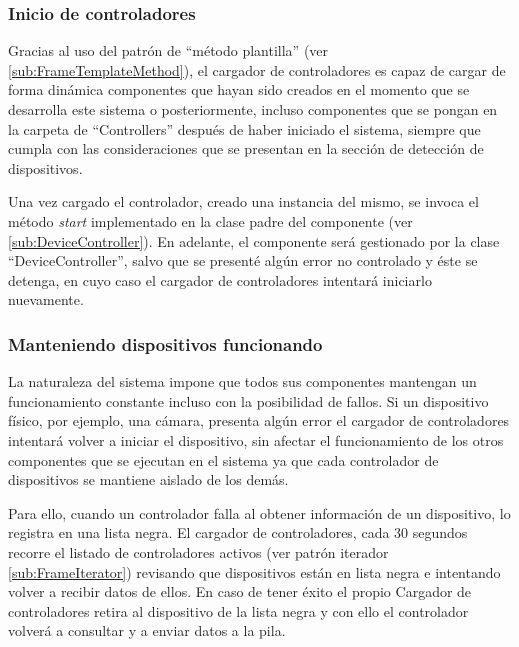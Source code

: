         \subsubsection{Inicio de controladores}
        \label{sub2:InputDeviceStarting}
            
            Gracias al uso del patrón de ``método plantilla'' (ver \ref{sub:FrameTemplateMethod}), el cargador de controladores es capaz de cargar de forma dinámica componentes que hayan sido creados en el momento que se desarrolla este sistema o posteriormente, incluso componentes que se pongan en la carpeta de ``Controllers'' después de haber iniciado el sistema, siempre que cumpla con las consideraciones que se presentan en la sección de detección de dispositivos.
            
            Una vez cargado el controlador, creado una instancia del mismo, se invoca el método \textit{start} implementado en la clase padre del componente (ver \ref{sub:DeviceController}). En adelante, el componente será gestionado por la clase ``DeviceController'', salvo que se presenté algún error no controlado y éste se detenga, en cuyo caso el cargador de controladores intentará iniciarlo nuevamente.
        
        \subsubsection{Manteniendo dispositivos funcionando}
        \label{sub2:InputDeviceKeepAlive}
            La naturaleza del sistema impone que todos sus componentes mantengan un funcionamiento constante incluso con la posibilidad de fallos. Si un dispositivo físico, por ejemplo, una cámara, presenta algún error el cargador de controladores intentará volver a iniciar el dispositivo, sin afectar el funcionamiento de los otros componentes que se ejecutan en el sistema ya que cada controlador de dispositivos se mantiene aislado de los demás.
            
            Para ello, cuando un controlador falla al obtener información de un dispositivo, lo registra en una lista negra. El cargador de controladores, cada 30 segundos recorre el listado de controladores activos (ver patrón iterador \ref{sub:FrameIterator}) revisando que dispositivos están en lista negra e intentando volver a recibir datos de ellos. En caso de tener éxito el propio Cargador de controladores retira al dispositivo de la lista negra y con ello el controlador volverá a consultar y a enviar datos a la pila.
            
